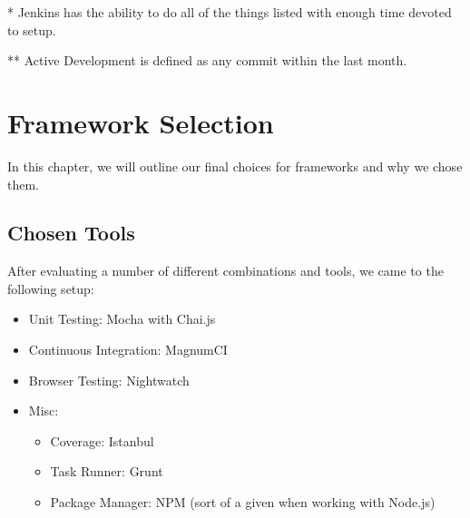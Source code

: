 \documentclass[12pt]{ucthesis}
\begin{document}
\normalsize
\FloatBarrier
\begin{table}[ht]
\end{table}
\FloatBarrier
\footnotesize

* Jenkins has the ability to do all of the things listed with enough time devoted to setup.

** Active Development is defined as any commit within the last month.

\normalsize
\chapter{Framework Selection}
In this chapter, we will outline our final choices for frameworks and why we chose them.

\section{Chosen Tools}
After evaluating a number of different combinations and tools, we came to the following setup:
\begin{itemize}
  \item Unit Testing: Mocha with Chai.js
  \item Continuous Integration: MagnumCI
  \item Browser Testing: Nightwatch
  \item Misc:
    \begin{itemize}
      \item Coverage: Istanbul
      \item Task Runner: Grunt
      \item Package Manager: NPM (sort of a given when working with Node.js)
    \end{itemize}
\end{itemize}
\end{document}
